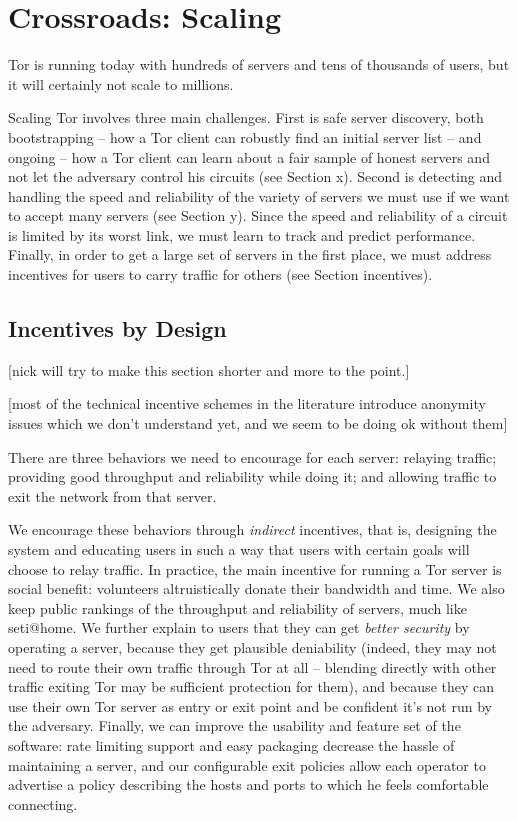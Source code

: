 \documentclass{llncs}
\begin{document}
\section{Crossroads: Scaling}

Tor is running today with hundreds of servers and tens of thousands of
users, but it will certainly not scale to millions.

Scaling Tor involves three main challenges.  First is safe server
discovery, both bootstrapping -- how a Tor client can robustly find an
initial server list -- and ongoing -- how a Tor client can learn about
a fair sample of honest servers and not let the adversary control his
circuits (see Section x).  Second is detecting and handling the speed
and reliability of the variety of servers we must use if we want to
accept many servers (see Section y).
Since the speed and reliability of a circuit is limited by its worst link,
we must learn to track and predict performance.  Finally, in order to get
a large set of servers in the first place, we must address incentives
for users to carry traffic for others (see Section incentives).

\subsection{Incentives by Design}

[nick will try to make this section shorter and more to the point.]

[most of the technical incentive schemes in the literature introduce
anonymity issues which we don't understand yet, and we seem to be doing
ok without them]

There are three behaviors we need to encourage for each server: relaying
traffic; providing good throughput and reliability while doing it;
and allowing traffic to exit the network from that server.

We encourage these behaviors through \emph{indirect} incentives, that
is, designing the system and educating users in such a way that users
with certain goals will choose to relay traffic.  In practice, the
main incentive for running a Tor server is social benefit: volunteers
altruistically donate their bandwidth and time.  We also keep public
rankings of the throughput and reliability of servers, much like
seti@home.  We further explain to users that they can get \emph{better
security} by operating a server, because they get plausible deniability
(indeed, they may not need to route their own traffic through Tor at all
-- blending directly with other traffic exiting Tor may be sufficient
protection for them), and because they can use their own Tor server
as entry or exit point and be confident it's not run by the adversary.
Finally, we can improve the usability and feature set of the software:
rate limiting support and easy packaging decrease the hassle of
maintaining a server, and our configurable exit policies allow each
operator to advertise a policy describing the hosts and ports to which
he feels comfortable connecting.
\end{document}
